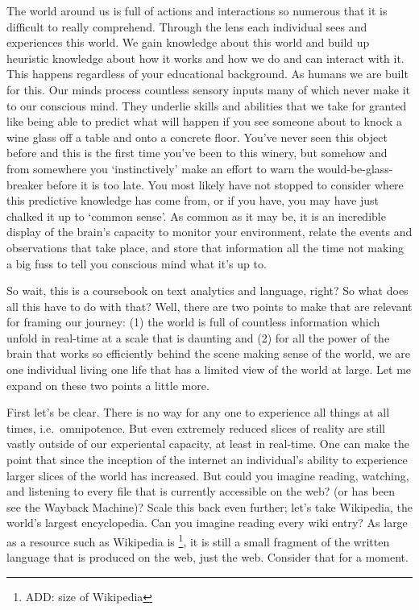 \documentclass[
]{article}
\begin{document}
The world around us is full of actions and interactions so numerous that it is difficult to really comprehend. Through the lens each individual sees and experiences this world. We gain knowledge about this world and build up heuristic knowledge about how it works and how we do and can interact with it. This happens regardless of your educational background. As humans we are built for this. Our minds process countless sensory inputs many of which never make it to our conscious mind. They underlie skills and abilities that we take for granted like being able to predict what will happen if you see someone about to knock a wine glass off a table and onto a concrete floor. You've never seen this object before and this is the first time you've been to this winery, but somehow and from somewhere you `instinctively' make an effort to warn the would-be-glass-breaker before it is too late. You most likely have not stopped to consider where this predictive knowledge has come from, or if you have, you may have just chalked it up to `common sense'. As common as it may be, it is an incredible display of the brain's capacity to monitor your environment, relate the events and observations that take place, and store that information all the time not making a big fuss to tell you conscious mind what it's up to.

So wait, this is a coursebook on text analytics and language, right? So what does all this have to do with that? Well, there are two points to make that are relevant for framing our journey: (1) the world is full of countless information which unfold in real-time at a scale that is daunting and (2) for all the power of the brain that works so efficiently behind the scene making sense of the world, we are one individual living one life that has a limited view of the world at large. Let me expand on these two points a little more.

First let's be clear. There is no way for any one to experience all things at all times, i.e.~omnipotence. But even extremely reduced slices of reality are still vastly outside of our experiental capacity, at least in real-time. One can make the point that since the inception of the internet an individual's ability to experience larger slices of the world has increased. But could you imagine reading, watching, and listening to every file that is currently accessible on the web? (or has been see the Wayback Machine)? Scale this back even further; let's take Wikipedia, the world's largest encyclopedia. Can you imagine reading every wiki entry? As large as a resource such as Wikipedia is \footnote{ADD: size of Wikipedia}, it is still a small fragment of the written language that is produced on the web, just the web. Consider that for a moment.
\end{document}
